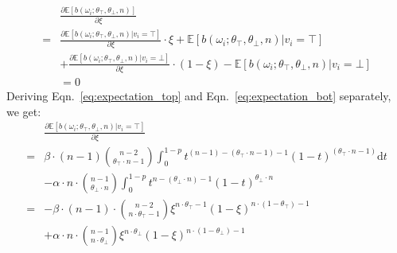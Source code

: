 \documentclass[11pt]{article}
\begin{document}
  \begin{equation}
    \label{eq:partial}
    \begin{aligned}
      &\frac{\partial\mathbb{E}[b(\omega_i;\theta_\top,\theta_\bot,n)]}{\partial\xi}\\
       =& \frac{\partial\mathbb{E}[b(\omega_i;\theta_\top,\theta_\bot,n )| v_i=\top]}{\partial\xi}\cdot \xi+ \mathbb{E}[b(\omega_i;\theta_\top,\theta_\bot,n )| v_i=\top]\\
      &+ \frac{\partial\mathbb{E}[b(\omega_i;\theta_\top,\theta_\bot,n )| v_i=\bot]}{\partial\xi}\cdot (1-\xi)-\mathbb{E}[b(\omega_i;\theta_\top,\theta_\bot,n )| v_i=\bot]\\
      & = 0
  \end{aligned}
  \end{equation}
  Deriving Eqn.~\ref{eq:expectation_top} and Eqn.~\ref{eq:expectation_bot} separately, we get:
  \begin{equation}
    \label{eq:expectation_top_partial}
    \begin{aligned}
      &\frac{\partial\mathbb{E}[b(\omega_i;\theta_\top,\theta_\bot,n )| v_i=\top]}{\partial\xi} \\
      =& \beta\cdot (n-1)\binom{n-2}{\theta_\top\cdot n-1}\int^{1-p}_0t^{(n - 1) - (\theta_\top\cdot n - 1) - 1} (1 - t)^{(\theta_\top\cdot n - 1)}\text{d} t\\
      &-\alpha\cdot n \cdot \binom{n-1}{\theta_\bot\cdot n}\int^{1-p}_0t^{n - (\theta_\bot\cdot n) - 1} (1 - t)^{\theta_\bot\cdot n}\\
      = &-\beta\cdot (n-1)\cdot \binom{n-2}{n\cdot\theta_\top-1}\xi^{n\cdot\theta_\top-1}(1-\xi)^{n\cdot(1-\theta_\top)-1} \\
      &+\alpha\cdot n \cdot \binom{n-1}{n\cdot\theta_\bot}\xi^{n\cdot\theta_\bot}(1-\xi)^{n\cdot(1-\theta_\bot)-1}\\
    \end{aligned}
  \end{equation}
\end{document}
